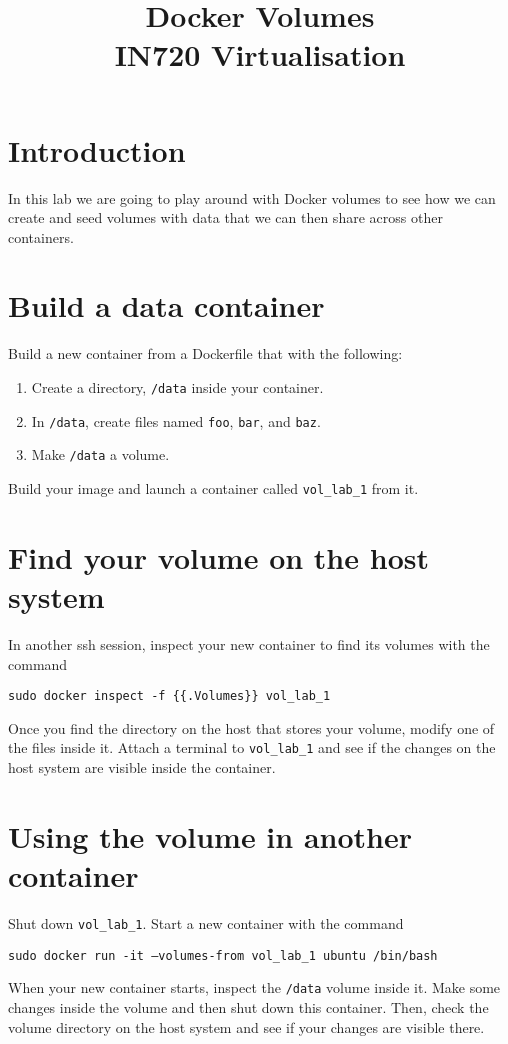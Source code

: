 \documentclass{article}
\begin{document}
\title{Docker Volumes\\ IN720 Virtualisation}
\date{}
\maketitle

\section*{Introduction}
In this lab we are going to play around with Docker volumes to see how we can create and seed volumes with data that we can then share across other containers.


\section{Build a data container}
Build a new container from a Dockerfile that with the following:

\begin{enumerate}
	\item Create a directory, \texttt{/data} inside your container.
	\item In \texttt{/data}, create files named \texttt{foo}, \texttt{bar}, and \texttt{baz}.
	\item Make \texttt{/data} a volume.
\end{enumerate}

Build your image and launch a container called \texttt{vol\_lab\_1} from it.


\section{Find your volume on the host system}
In another ssh session, inspect your new container to find its volumes with the command

\texttt{sudo docker inspect -f \{\{.Volumes\}\} vol\_lab\_1}

Once you find the directory on the host that stores your volume, modify one of the files inside it.  Attach a terminal to \texttt{vol\_lab\_1} and see if the changes on the host system are visible inside the container.

\section{Using the volume in another container}
Shut down \texttt{vol\_lab\_1}.  Start a new container with the command

\texttt{sudo docker run -it  --volumes-from vol\_lab\_1 ubuntu /bin/bash}

When your new container starts, inspect the \texttt{/data} volume inside it.  Make some changes inside the volume and then shut down this container.  Then, check the volume directory on the host system and see if your changes are visible there.
\end{document}
